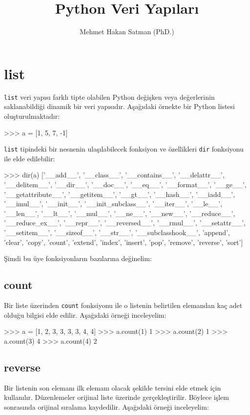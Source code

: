 \documentclass[12pt]{report}
\author{Mehmet Hakan Satman (PhD.)}
\title{Python Veri Yapıları}
\begin{document}
	\maketitle
	\tableofcontents
	
\pagebreak
\section{list}

\texttt{list} veri yapısı farklı tipte olabilen Python değişken veya değerlerinin saklanabildiği dinamik bir veri yapısıdır. Aşağıdaki örnekte bir Python listesi oluşturulmaktadır:

\begin{python}
>>> a = [1, 5, 7, -1]
\end{python}

\texttt{list} tipindeki bir nesnenin ulaşılabilecek fonksiyon ve özellikleri \texttt{dir} fonksiyonu ile elde edilebilir:

\begin{python}
	>>> dir(a)
	['__add__', '__class__', '__contains__', '__delattr__', '__delitem__', '__dir__', '__doc__', '__eq__', '__format__', '__ge__', '__getattribute__', '__getitem__', '__gt__', '__hash__', '__iadd__', '__imul__', '__init__', '__init_subclass__', '__iter__', '__le__', '__len__', '__lt__', '__mul__', '__ne__', '__new__', '__reduce__', '__reduce_ex__', '__repr__', '__reversed__', '__rmul__', '__setattr__', '__setitem__', '__sizeof__', '__str__', '__subclasshook__', 'append', 'clear', 'copy', 'count', 'extend', 'index', 'insert', 'pop', 'remove', 'reverse', 'sort']
\end{python}

Şimdi bu üye fonksiyonların bazılarına değinelim:

\subsection{count}
Bir liste üzerinden \texttt{count} fonksiyonu ile o listenin belirtilen elemandan kaç adet olduğu bilgisi elde edilir. Aşağıdaki örneği inceleyelim:

\begin{python}
>>> a = [1, 2, 3, 3, 3, 3, 4, 4]
>>> a.count(1)
1
>>> a.count(2)
1
>>> a.count(3)
4
>>> a.count(4)
2	
\end{python}

\subsection{reverse}
Bir listenin son elemanı ilk elemanı olacak şekilde tersini elde etmek için kullanılır. Düzenlemeler orijinal liste üzerinde gerçekleştirilir. Böylece işlem sonrasında orijinal sıralama kaydedilir. Aşağıdaki örneği inceleyelim:
\end{document}
